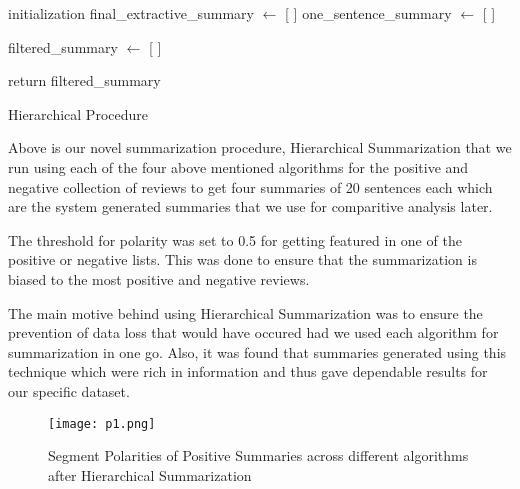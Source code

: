\documentclass[conference]{IEEEtran}
\begin{document}
\begin{algorithm}[H]
 initialization\;
 final\_extractive\_summary $\leftarrow$ [ ] \;
 one\_sentence\_summary $\leftarrow$ [ ] \;
 
 filtered\_summary $\leftarrow$ [ ] \;
 


return filtered\_summary \;

 \caption{Hierarchical Procedure}
\end{algorithm}

Above is our novel summarization procedure, Hierarchical Summarization that we run using each of the four above mentioned algorithms for the positive and negative collection of reviews to get four summaries of 20 sentences each which are the system generated summaries that we use for comparitive analysis later. 

The threshold for polarity was set to 0.5 for getting featured in one of the positive or negative lists. This was done to ensure that the summarization is biased to the most positive and negative reviews. 

The main motive behind using Hierarchical Summarization was to ensure the prevention of data loss that would have occured had we used each algorithm for summarization in one go. Also, it was found that summaries generated using this technique which were rich in information and thus gave dependable results for our specific dataset.\\

\begin{figure}[h!]
  \texttt{[image: p1.png]}
  \caption{Segment Polarities of Positive Summaries across different algorithms after Hierarchical Summarization}
  \label{fig:boat1}
\end{figure}
\end{document}
